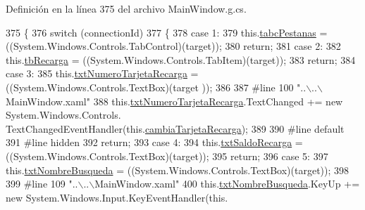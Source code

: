 Definición en la línea 375 del archivo Main\-Window.\-g.\-cs.


\begin{DoxyCode}
375                                                                                                 \{
376             \textcolor{keywordflow}{switch} (connectionId)
377             \{
378             \textcolor{keywordflow}{case} 1:
379             this.\hyperlink{class_proyecto___integrador__3_1_1_main_window_a46bffd3bc6bf702252e6568b9c00f35c}{tabcPestanas} = ((System.Windows.Controls.TabControl)(target));
380             \textcolor{keywordflow}{return};
381             \textcolor{keywordflow}{case} 2:
382             this.\hyperlink{class_proyecto___integrador__3_1_1_main_window_af0f488983962bf0457a4b9d02c1df2a6}{tbRecarga} = ((System.Windows.Controls.TabItem)(target));
383             \textcolor{keywordflow}{return};
384             \textcolor{keywordflow}{case} 3:
385             this.\hyperlink{class_proyecto___integrador__3_1_1_main_window_a921e64f5a9f1531f12802b32f06bf71b}{txtNumeroTarjetaRecarga} = ((System.Windows.Controls.TextBox)(target
      ));
386             
387 \textcolor{preprocessor}{            #line 100 "..\(\backslash\)..\(\backslash\)MainWindow.xaml"}
388 \textcolor{preprocessor}{}            this.\hyperlink{class_proyecto___integrador__3_1_1_main_window_a921e64f5a9f1531f12802b32f06bf71b}{txtNumeroTarjetaRecarga}.TextChanged += \textcolor{keyword}{new} System.Windows.Controls.
      TextChangedEventHandler(this.\hyperlink{class_proyecto___integrador__3_1_1_main_window_ae62fbb5bc9da0f805d207465ef0ac41a}{cambiaTarjetaRecarga});
389             
390 \textcolor{preprocessor}{            #line default}
391 \textcolor{preprocessor}{}\textcolor{preprocessor}{            #line hidden}
392 \textcolor{preprocessor}{}            \textcolor{keywordflow}{return};
393             \textcolor{keywordflow}{case} 4:
394             this.\hyperlink{class_proyecto___integrador__3_1_1_main_window_aeb68364159bb1ed1dbf417a205fd3519}{txtSaldoRecarga} = ((System.Windows.Controls.TextBox)(target));
395             \textcolor{keywordflow}{return};
396             \textcolor{keywordflow}{case} 5:
397             this.\hyperlink{class_proyecto___integrador__3_1_1_main_window_a8b7a97d30e0788fb2ff72eaee1d0ab88}{txtNombreBusqueda} = ((System.Windows.Controls.TextBox)(target));
398             
399 \textcolor{preprocessor}{            #line 109 "..\(\backslash\)..\(\backslash\)MainWindow.xaml"}
400 \textcolor{preprocessor}{}            this.\hyperlink{class_proyecto___integrador__3_1_1_main_window_a8b7a97d30e0788fb2ff72eaee1d0ab88}{txtNombreBusqueda}.KeyUp += \textcolor{keyword}{new} System.Windows.Input.KeyEventHandler(this.

\end{DoxyCode}
